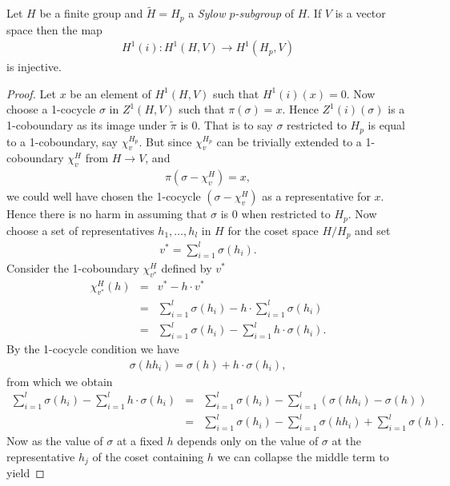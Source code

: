 \begin{lemma}\label{ch4::mapFromSylow}
Let $H$ be a finite group and $\tilde{H} = H_p$ a \emph{Sylow $p$-subgroup} of $H$. If $V$ is a vector space then the map 
\begin{eqnarray*}
H^1(i):H^1(H, V)\rightarrow H^1(H_p, V)
\end{eqnarray*}
is injective.
\end{lemma}
\begin{proof}
Let $x$ be an element of $H^1(H, V)$ such that $H^1(i)(x) = 0$. Now choose a 1-cocycle $\sigma$ in $Z^1(H, V)$ such that $\pi(\sigma) = x$. Hence $Z^1(i)(\sigma)$ is a 1-coboundary as its image under $\tilde\pi$ is 0. That is to say $\sigma$ restricted to $H_p$ is equal to a 1-coboundary, say $\chi_v^{H_p}$. But since $\chi_v^{H_p}$ can be trivially extended to a 1-coboundary $\chi_v^H$ from $H\rightarrow V$, and
\begin{eqnarray*}
	\pi(\sigma - \chi_v^H) = x,
\end{eqnarray*}
we could well have chosen the 1-cocycle $(\sigma - \chi_v^H)$ as a representative for $x$. Hence there is no harm in assuming that $\sigma$ is 0 when restricted to $H_p$.
Now choose a set of representatives $h_1, \ldots, h_l$ in $H$ for the coset space $H/H_p$ and set
\begin{eqnarray*}
	v^* = \sum_{i =1}^l \sigma(h_i).
\end{eqnarray*}
Consider the 1-coboundary $\chi_{v^*}^H$ defined by $v^*$
\begin{eqnarray*}
	\chi_{v^*}^H(h) &=& v^* - h\cdot v^* \\
	&=& \sum_{i = 1}^l\sigma(h_i) - h\cdot \sum_{i = 1}^l\sigma(h_i) \\
	&=& \sum_{i = 1}^l\sigma(h_i) - \sum_{i = 1}^l h\cdot \sigma(h_i).
\end{eqnarray*}
By the 1-cocycle condition we have
\begin{eqnarray*}
	\sigma(h h_i) = \sigma(h) + h\cdot\sigma(h_i),
\end{eqnarray*}
from which we obtain
\begin{eqnarray*}
	 \sum_{i = 1}^l\sigma(h_i) - \sum_{i = 1}^l h\cdot \sigma(h_i) &=& \sum_{i = 1}^l\sigma(h_i) - \sum_{i = 1}^l \left(\sigma(hh_i) - \sigma(h) \right)\\
	 &=& \sum_{i = 1}^l\sigma(h_i) - \sum_{i = 1}^l \sigma(hh_i) +\sum_{i = 1}^l \sigma(h).
\end{eqnarray*}
Now as the value of $\sigma$ at a fixed $h$ depends only on the value of $\sigma$ at the representative $h_j$ of the coset containing $h$ we can collapse the middle term to yield

\end{proof}
